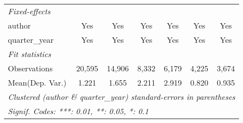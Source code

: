\begin{tabular}{lcccccc}
   \midrule
   \emph{Fixed-effects}\\
   author                                & Yes           & Yes           & Yes           & Yes           & Yes           & Yes\\  
   quarter\_year                         & Yes           & Yes           & Yes           & Yes           & Yes           & Yes\\  
   \midrule
   \emph{Fit statistics}\\
   Observations                          & 20,595        & 14,906        & 8,332         & 6,179         & 4,225         & 3,674\\  
Mean(Dep. Var.) & 1.221 & 1.655 & 2.211 & 2.919 & 0.820 & 0.935 \\
   \midrule \midrule
   \multicolumn{7}{l}{\emph{Clustered (author \& quarter\_year) standard-errors in parentheses}}\\
   \multicolumn{7}{l}{\emph{Signif. Codes: ***: 0.01, **: 0.05, *: 0.1}}\\
\end{tabular}
\par\endgroup
